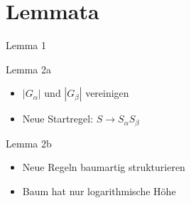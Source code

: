 \section{Lemmata}

\begin{frame}{\FrameName}
\begin{block}{Lemma 1}
  \begin{center}
  \end{center}
  \begin{center}
  \end{center}
  
\end{block}
\end{frame}

\begin{frame}{\FrameName}
\begin{block}{Lemma 2a}
  \begin{center}
  \end{center}
  \begin{itemize}
    \item<2-> $|G_\alpha|$ und $|G_\beta|$ vereinigen
    \item<3-> Neue Startregel: $S \rightarrow S_\alpha S_\beta$
  \end{itemize}
  
\end{block}
\end{frame}

\begin{frame}{\FrameName}
  \begin{block}{Lemma 2b}
    \begin{center}
    \end{center}
    \begin{itemize}
      \item<2-> Neue Regeln baumartig strukturieren
      \item<3-> Baum hat nur logarithmische Höhe
    \end{itemize}
    
  \end{block}
    \end{frame}

